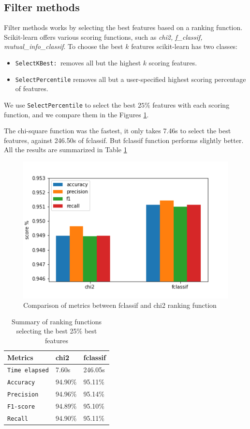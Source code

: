 \subsection{Filter methods}

Filter methods works by selecting the best features based on a ranking function. Scikit-learn offers various scoring functions, such as \textit{chi2, f\_classif, mutual\_info\_classif}. To choose the best $k$ features scikit-learn has two classes:
\begin{itemize}
	\item \texttt{SelectKBest: }removes all but the highest $k$ scoring features.
	\item \texttt{SelectPercentile} removes all but a user-specified highest scoring percentage of features.
\end{itemize} 
We use \texttt{SelectPercentile} to select the best $25\%$ features with each scoring function, and we compare them in the Figures \ref{fig:chi2-flcassif}.


The chi-square function was the fastest, it only takes 7.46s to select the best features, against 246.50s of fclassif. But fclassif function performs slightly better. All the results are summarized in Table \ref{tab:rank_function}

\begin{figure}[!h]
	\centering
	\includegraphics[width=0.6\columnwidth]{chi2-fclassif.png}
	\caption{Comparison of metrics between fclassif and chi2 ranking function}
	\label{fig:chi2-flcassif}
\end{figure}

\begin{table}[!htb]
	\centering
	\caption{Summary of ranking functions selecting the best 25\% best features}
	\label{tab:rank_function}
	\begin{tabular}{lll}
		\toprule
		\textbf{Metrics}  & \textbf{chi2} & \textbf{fclassif }\\
		\midrule
		\texttt{Time elapsed} & 7.60s & 246.05s\\
	
		\texttt{Accuracy} & 94.90\% &  95.11\%      \\ 
		\texttt{Precision}  & 94.96\% & 95.14\%          \\ 
		\texttt{F1-score}  &   94.89\%   & 95.10\%          \\ 
		\texttt{Recall} & 94.90\%  &   95.11\%       \\ 
					\bottomrule
	\end{tabular}
	
\end{table}




